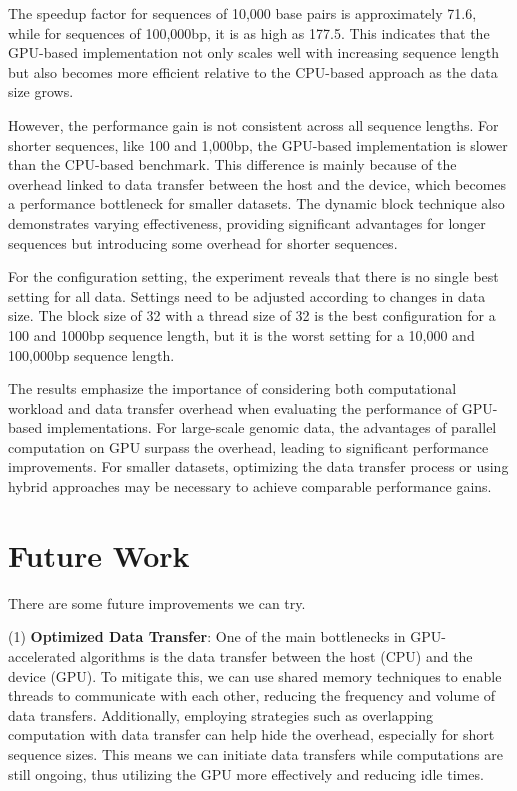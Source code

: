 \documentclass[PhD]{PHlab-thesis}
\begin{document}
The speedup factor for sequences of 10,000 base pairs is approximately 71.6, while for sequences of 100,000bp, it is as high as 177.5. This indicates that the GPU-based implementation not only scales well with increasing sequence length but also becomes more efficient relative to the CPU-based approach as the data size grows.

However, the performance gain is not consistent across all sequence lengths. For shorter sequences, like 100 and 1,000bp, the GPU-based implementation is slower than the CPU-based benchmark. This difference is mainly because of the overhead linked to data transfer between the host and the device, which becomes a performance bottleneck for smaller datasets. The dynamic block technique also demonstrates varying effectiveness, providing significant advantages for longer sequences but introducing some overhead for shorter sequences.

For the configuration setting, the experiment reveals that there is no single best setting for all data. Settings need to be adjusted according to changes in data size. The block size of 32 with a thread size of 32 is the best configuration for a 100 and 1000bp sequence length, but it is the worst setting for a 10,000 and 100,000bp sequence length.

The results emphasize the importance of considering both computational workload and data transfer overhead when evaluating the performance of GPU-based implementations. For large-scale genomic data, the advantages of parallel computation on GPU surpass the overhead, leading to significant performance improvements. For smaller datasets, optimizing the data transfer process or using hybrid approaches may be necessary to achieve comparable performance gains.

\section{Future Work}
There are some future improvements we can try. 

(1) \textbf{Optimized Data Transfer}: One of the main bottlenecks in GPU-accelerated algorithms is the data transfer between the host (CPU) and the device (GPU). To mitigate this, we can use shared memory techniques to enable threads to communicate with each other, reducing the frequency and volume of data transfers. Additionally, employing strategies such as overlapping computation with data transfer can help hide the overhead, especially for short sequence sizes. This means we can initiate data transfers while computations are still ongoing, thus utilizing the GPU more effectively and reducing idle times.
\end{document}
